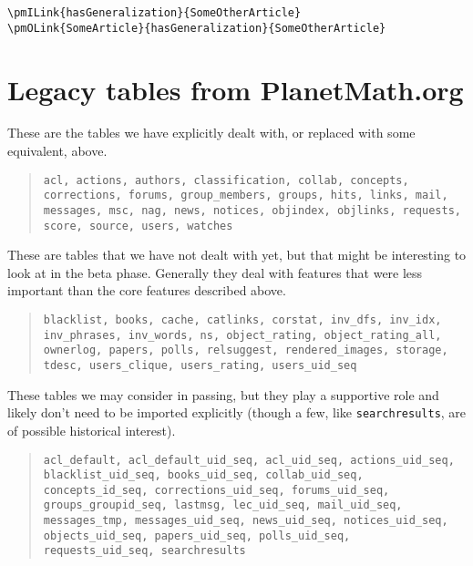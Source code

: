 \documentclass{article}
\begin{document}
\begin{verbatim}
\pmILink{hasGeneralization}{SomeOtherArticle}
\pmOLink{SomeArticle}{hasGeneralization}{SomeOtherArticle}
\end{verbatim}

\appendix

\section{Legacy tables from PlanetMath.org}

These are the tables we have explicitly dealt with, or
replaced with some equivalent, above.

\begin{quotation}
\begin{minipage}{4in}
{\tt acl, actions, authors, classification, collab,
  concepts, corrections, forums, group\_members, groups,
  hits, links, mail, messages, msc, nag, news, notices,
  objindex, objlinks, requests, score, source, users,
  watches }
\end{minipage}
\end{quotation}

These are tables that we have not dealt with yet, but that
might be interesting to look at in the beta phase.
Generally they deal with features that were less important
than the core features described above.

\begin{quotation}
\begin{minipage}{4in}
{\tt blacklist, books, cache, catlinks, corstat, inv\_dfs,
  inv\_idx, inv\_phrases, inv\_words, ns, object\_rating,
  object\_rating\_all, ownerlog, papers, polls,
  relsuggest, rendered\_images, storage, tdesc,
  users\_clique, users\_rating, users\_uid\_seq }
\end{minipage}
\end{quotation}

These tables we may consider in passing, but they play a
supportive role and likely don't need to be imported
explicitly (though a few, like {\tt searchresults}, are of
possible historical interest).

\begin{quotation}
\begin{minipage}{4in}
{\tt acl\_default, acl\_default\_uid\_seq, acl\_uid\_seq,
  actions\_uid\_seq, blacklist\_uid\_seq, books\_uid\_seq,
  collab\_uid\_seq, concepts\_id\_seq,
  corrections\_uid\_seq, forums\_uid\_seq,
  groups\_groupid\_seq, lastmsg, lec\_uid\_seq,
  mail\_uid\_seq, messages\_tmp, messages\_uid\_seq,
  news\_uid\_seq, notices\_uid\_seq, objects\_uid\_seq,
  papers\_uid\_seq, polls\_uid\_seq, requests\_uid\_seq,
  searchresults }
\end{minipage}
\end{quotation}
\end{document}
